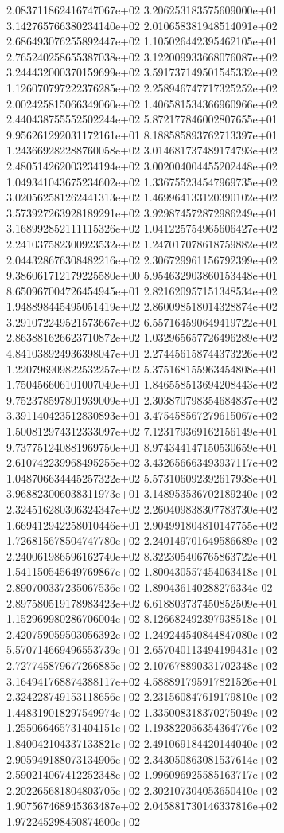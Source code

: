 2.083711862416747067e+02 3.206253183575609000e+01 3.142765766380234140e+02
2.010658381948514091e+02 2.686493076255892447e+02 1.105026442395462105e+01
2.765240258655387038e+02 3.122009933668076087e+02 3.244432000370159699e+02
3.591737149501545332e+02 1.126070797222376285e+02 2.258946747717325252e+02
2.002425815066349060e+02 1.406581534366960966e+02 2.440438755552502244e+02
5.872177846002807655e+01 9.956261292031172161e+01 8.188585893762713397e+01
1.243669282288760058e+02 3.014681737489174793e+02 2.480514262003234194e+02
3.002004004455202448e+02 1.049341043675234602e+02 1.336755234547969735e+02
3.020562581262441313e+02 1.469964133120390102e+02 3.573927263928189291e+02
3.929874572872986249e+01 3.168992852111115326e+02 1.041225754965606427e+02
2.241037582300923532e+02 1.247017078618759882e+02 2.044328676308482216e+02
2.306729961156792399e+02 9.386061712179225580e+00 5.954632903860153448e+01
8.650967004726454945e+01 2.821620957151348534e+02 1.948898445495051419e+02
2.860098518014328874e+02 3.291072249521573667e+02 6.557164590649419722e+01
2.863881626623710872e+02 1.032965657726496289e+02 4.841038924936398047e+01
2.274456158744373226e+02 1.220796909822532257e+02 5.375168155963454808e+01
1.750456606101007040e+01 1.846558513694208443e+02 9.752378597801939009e+01
2.303870798354684837e+02 3.391140423512830893e+01 3.475458567279615067e+02
1.500812974312333097e+02 7.123179369162156149e+01 9.737751240881969750e+01
8.974344147150530659e+01 2.610742239968495255e+02 3.432656663493937117e+02
1.048706634445257322e+02 5.573106092392617938e+01 3.968823006038311973e+01
3.148953536702189240e+02 2.324516280306324347e+02 2.260409838307783730e+02
1.669412942258010446e+01 2.904991804810147755e+02 1.726815678504747780e+02
2.240149701649586689e+02 2.240061986596162740e+02 8.322305406765863722e+01
1.541150545649769867e+02 1.800430557454063418e+01 2.890700337235067536e+02
1.890436140288276334e-02 2.897580519178983423e+02 6.618803737450852509e+01
1.152969980286706004e+02 8.126682492397938518e+01 2.420759059503056392e+02
1.249244540844847080e+02 5.570714669496553739e+01 2.657040113494199431e+02
2.727745879677266885e+02 2.107678890331702348e+02 3.164941768874388117e+02
4.588891795917821526e+01 2.324228749153118656e+02 2.231560847619179810e+02
1.448319018297549974e+02 1.335008318370275049e+02 1.255066465731404151e+02
1.193822056354364776e+02 1.840042104337133821e+02 2.491069184420144040e+02
2.905949188073134906e+02 2.343050863081537614e+02 2.590214067412252348e+02
1.996096925585163717e+02 2.202265681804803705e+02 2.302107304053650410e+02
1.907567468945363487e+02 2.045881730146337816e+02 1.972245298450874600e+02
